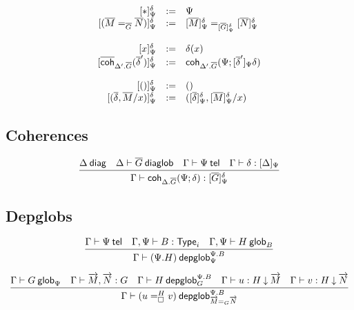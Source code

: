 \begin{small}
  \[
  \begin{array}{rcl}
    \interpglob{\diagbase}{\Psi}{\delta} & := & \Psi \\
    \interpglob{(\homj{\diag G}{\diag M}{\diag N})}{\Psi}{\delta} & := &
    \homj{\interpglob{\diag G}{\Psi}{\delta}}{\interpglob{\diag M}{\Psi}{\delta}}
    {\interpglob{\diag N}{\Psi}{\delta}}\\\\

    \interpglob{x}{\Psi}{\delta} & := & \delta(x) \\
    \interpglob{\diagcoh{\Delta'.\diag{G}}{\diag \delta'}}{\Psi}{\delta} & := &
    \coh{\Delta'.\diag G}{\Psi}{\interpdiag{\diag\delta'}{\Psi}{\delta}}\\\\

    \interpglob{()}{\Psi}{\delta} & := & () \\
    \interpglob{(\diag \delta,\diag M/x)}{\Psi}{\delta} & := &
    (\interpglob{\diag\delta}{\Psi}{\delta},\interpglob{\diag
    M}{\Psi}{\delta}/x)
  \end{array}
  \]
\end{small}

\subsection{Coherences}

\begin{small}
  \[
  \infer{\ofglob{\Gamma}{\coh{{\Delta}.\diag{G}}{\Psi}{\delta}}
    {\interpglob{\diag{G}}{\Psi}{\delta}}}
  {\wfdiag{\Delta}
    & \wfdiaglob{\Delta}{\diag G}
    & \wftel{\Gamma}{\Psi}
    & \ofinterp{\Gamma}{\delta}{\Delta}{\Psi}}
  \]
\end{small}

\subsection{Depglobs}

\begin{small}
  \[\infer{\wfdepglob{\Gamma}{(\Psi.H)}{\Psi.B}{\Psi}}
  {\wftel{\Gamma}{\Psi}
    & \wftype{\Gamma,\Psi}{B}
    & \wfglob{\Gamma,\Psi}{H}{B}
  }\]

  \[\infer{\wfdepglob{\Gamma}{(\dhomj{H}{u}{v}{\blank})}
    {\Psi.B}{\homj{G}{\tel{M}}{\tel{N}}}}
  {\wfglob{\Gamma}{G}{\Psi}
    & \ofglob{\Gamma}{\tel{M},\tel{N}}{G}
    & \wfdepglob{\Gamma}{H}{\Psi.B}{G}
    & \ofdepglob{\Gamma}{u}{H}{\tel{M}}
    & \ofdepglob{\Gamma}{v}{H}{\tel{N}}}\]
\end{small}

